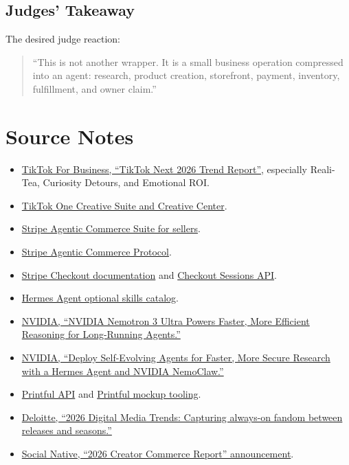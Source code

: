 \documentclass[11pt]{article}
\begin{document}
\subsection{Judges' Takeaway}

The desired judge reaction:

\begin{quote}
  ``This is not another wrapper. It is a small business operation compressed into an agent: research, product creation, storefront, payment, inventory, fulfillment, and owner claim.''
\end{quote}

\section{Source Notes}

\begin{itemize}
  \item \href{https://ads.tiktok.com/business/en-US/next}{TikTok For Business, ``TikTok Next 2026 Trend Report''}, especially Reali-Tea, Curiosity Detours, and Emotional ROI.
  \item \href{https://ads.tiktok.com/creative/creativeCenter}{TikTok One Creative Suite and Creative Center}.
  \item \href{https://docs.stripe.com/agentic-commerce/for-sellers}{Stripe Agentic Commerce Suite for sellers}.
  \item \href{https://docs.stripe.com/agentic-commerce/acp}{Stripe Agentic Commerce Protocol}.
  \item \href{https://docs.stripe.com/payments/checkout}{Stripe Checkout documentation} and \href{https://docs.stripe.com/api/checkout/sessions}{Checkout Sessions API}.
  \item \href{https://hermes-agent.nousresearch.com/docs/reference/optional-skills-catalog}{Hermes Agent optional skills catalog}.
  \item \href{https://developer.nvidia.com/blog/nvidia-nemotron-3-ultra-powers-faster-more-efficient-reasoning-for-long-running-agents/}{NVIDIA, ``NVIDIA Nemotron 3 Ultra Powers Faster, More Efficient Reasoning for Long-Running Agents.''}
  \item \href{https://developer.nvidia.com/blog/deploy-self-evolving-agents-for-faster-more-secure-research-with-a-hermes-agent-and-nvidia-nemoclaw/}{NVIDIA, ``Deploy Self-Evolving Agents for Faster, More Secure Research with a Hermes Agent and NVIDIA NemoClaw.''}
  \item \href{https://www.printful.com/api}{Printful API} and \href{https://www.printful.com/mockup-generator}{Printful mockup tooling}.
  \item \href{https://www.deloitte.com/us/en/insights/industry/technology/digital-media-trends-consumption-habits-survey.html}{Deloitte, ``2026 Digital Media Trends: Capturing always-on fandom between releases and seasons.''}
  \item \href{https://www.socialnative.com/articles/2026-creator-commerce-report/}{Social Native, ``2026 Creator Commerce Report'' announcement}.
\end{itemize}
\end{document}
